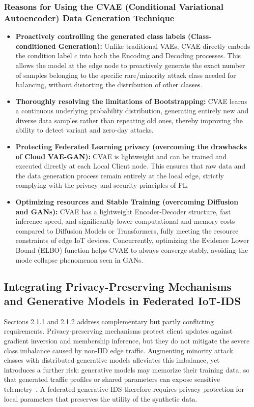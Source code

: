 \subsubsection{Reasons for Using the CVAE (Conditional Variational Autoencoder) Data Generation Technique}
\begin{itemize}
    \item \textbf{Proactively controlling the generated class labels (Class-conditioned Generation):} Unlike traditional VAEs, CVAE directly embeds the condition label $c$ into both the Encoding and Decoding processes. This allows the model at the edge node to proactively generate the exact number of samples belonging to the specific rare/minority attack class needed for balancing, without distorting the distribution of other classes.
    \item \textbf{Thoroughly resolving the limitations of Bootstrapping:} CVAE learns a continuous underlying probability distribution, generating entirely new and diverse data samples rather than repeating old ones, thereby improving the ability to detect variant and zero-day attacks.
    \item \textbf{Protecting Federated Learning privacy (overcoming the drawbacks of Cloud VAE-GAN):} CVAE is lightweight and can be trained and executed directly at each Local Client node. This ensures that raw data and the data generation process remain entirely at the local edge, strictly complying with the privacy and security principles of FL.
    \item \textbf{Optimizing resources and Stable Training (overcoming Diffusion and GANs):} CVAE has a lightweight Encoder-Decoder structure, fast inference speed, and significantly lower computational and memory costs compared to Diffusion Models or Transformers, fully meeting the resource constraints of edge IoT devices. Concurrently, optimizing the Evidence Lower Bound (ELBO) function helps CVAE to always converge stably, avoiding the mode collapse phenomenon seen in GANs.
\end{itemize}

\subsection{Integrating Privacy-Preserving Mechanisms and Generative Models in Federated IoT-IDS}

Sections 2.1.1 and 2.1.2 address complementary but partly conflicting requirements. Privacy-preserving mechanisms protect client updates against gradient inversion and membership inference, but they do not mitigate the severe class imbalance caused by non-IID edge traffic. Augmenting minority attack classes with distributed generative models alleviates this imbalance, yet introduces a further risk: generative models may memorize their training data, so that generated traffic profiles or shared parameters can expose sensitive telemetry~\cite{cunhaneto2023}. A federated generative IDS therefore requires privacy protection for local parameters that preserves the utility of the synthetic data.

